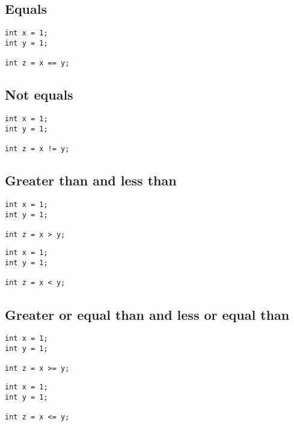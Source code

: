 
\subsection{Equals}

\begin{verbatim}
int x = 1;
int y = 1;

int z = x == y;
\end{verbatim}

\subsection{Not equals}

\begin{verbatim}
int x = 1;
int y = 1;

int z = x != y;
\end{verbatim}

\subsection{Greater than and less than}

\begin{verbatim}
int x = 1;
int y = 1;

int z = x > y;
\end{verbatim}

\begin{verbatim}
int x = 1;
int y = 1;

int z = x < y;
\end{verbatim}

\subsection{Greater or equal than and less or equal than}

\begin{verbatim}
int x = 1;
int y = 1;

int z = x >= y;
\end{verbatim}

\begin{verbatim}
int x = 1;
int y = 1;

int z = x <= y;
\end{verbatim}

